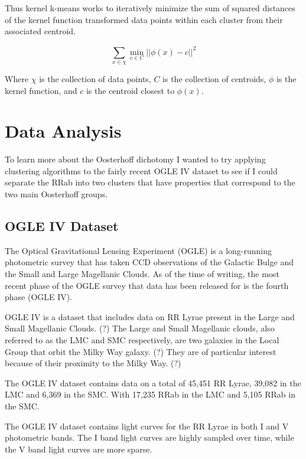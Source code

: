 \documentclass[]{article}
\begin{document}
Thus kernel k-means works to iteratively minimize the sum of squared distances of the kernel function transformed data points within each cluster from their associated centroid.

$$
\sum_{x \in \chi}^{}\min_{c \in C} || \phi(x) - c ||^2
$$

Where $\chi$ is the collection of data points, $C$ is the collection of centroids, $\phi$ is the kernel function, and $c$ is the centroid closest to $\phi(x)$.


\newpage

\section{Data Analysis}

To learn more about the Oosterhoff dichotomy I wanted to try applying clustering algorithms to the fairly recent OGLE IV dataset to see if I could separate the RRab into two clusters that have properties that correspond to the two main Oosterhoff groups.

\subsection{OGLE IV Dataset}

The Optical Gravitational Lensing Experiment (OGLE) is a long-running photometric survey that has taken CCD observations of the Galactic Bulge and the Small and Large Magellanic Clouds. \cite{udalski_1992, soszynski_2016} As of the time of writing, the most recent phase of the OGLE survey that data has been released for is the fourth phase (OGLE IV). \cite{soszynski_2016}

OGLE IV is a dataset that includes data on RR Lyrae present in the Large and Small Magellanic Clouds. (?) The Large and Small Magellanic clouds, also referred to as the LMC and SMC respectively, are two galaxies in the Local Group that orbit the Milky Way galaxy. (?) They are of particular interest because of their proximity to the Milky Way. (?)

The OGLE IV dataset contains data on a total of 45,451 RR Lyrae, 39,082 in the LMC and 6,369 in the SMC. With 17,235 RRab in the LMC and 5,105 RRab in the SMC. \cite{soszynski_2016}

The OGLE IV dataset contains light curves for the RR Lyrae in both I and V photometric bands. The I band light curves are highly sampled over time, while the V band light curves are more sparse. \cite{soszynski_2016}
\end{document}
